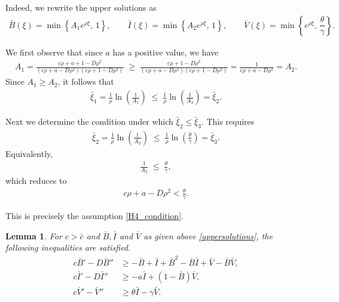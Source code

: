 \documentclass[11pt]{article}
\newtheorem{lemma}[thm]{Lemma}
\theoremstyle{definition}
\begin{document}
Indeed,  we rewrite the upper solutions as
\begin{align}\nonumber
    \bar{B}(\xi)=\min\left\{A_1 e^{\rho \xi},\, 1\right\}, 
    \qquad 
    \bar{I}(\xi)=\min\left\{A_2 e^{\rho \xi},\, 1\right\},
    \qquad 
    \bar{V}(\xi)=\min \left\{e^{\rho \xi},\, \dfrac{\theta}{\gamma}\right\}.
\end{align}

We first observe that since $a$ has a positive value, we have
\begin{align}
   A_1
   =\frac{c\rho + a + 1 - D\rho^{2}}{(c\rho + a - D\rho^{2})(c\rho + 1 - D\rho^{2})}
   \;\ge\;
   \frac{c\rho + 1 - D\rho^{2}}{(c\rho + a - D\rho^{2})(c\rho + 1 - D\rho^{2})}
   =\frac{1}{c\rho + a - D\rho^{2}}
   =A_2.
\end{align}
Since $A_1 \ge A_2$, it follows that
\begin{align}
    \bar{\xi}_1
    =\frac{1}{\rho}\ln\!\left(\frac{1}{A_1}\right)
    \;\le\;
    \frac{1}{\rho}\ln\!\left(\frac{1}{A_2}\right)
    =\bar{\xi}_2.
\end{align}

Next we determine the condition under which $\bar{\xi}_2 \le \bar{\xi}_3$.  
This requires
\begin{align}
    \bar{\xi}_2
    =\frac{1}{\rho}\ln\!\left(\frac{1}{A_2}\right)
    \;\le\;
    \frac{1}{\rho}\ln\!\left(\frac{\theta}{\gamma}\right)
    =\bar{\xi}_3.
\end{align}
Equivalently,
\begin{align}
    \frac{1}{A_2} \;\le\; \frac{\theta}{\gamma},
\end{align}
which reduces to
\begin{align}
    c\rho + a - D\rho^2 < \frac{\theta}{\gamma}.
\end{align}

This is precisely the assumption \eqref{H4_condition}.

\begin{lemma}
    For $c> \bar{c}$ and $\bar{B}, \bar{I}$ and $\bar{V}$ as given above \eqref{uppersolutions}, the following inequalities are satisfied. 
    \begin{align}\label{upper_condition_lemma}
      \nonumber  c \bar{B}'- D \bar{B}'' 
 &\geq- \bar{B}+\bar I +\bar{B}^2-\bar{B} \bar{I}+ \bar{V}-\bar{B} \bar{V}, \\  c \bar{I}'- D \bar{I}'' 
 &\geq -a\bar{I}+ (1-\bar{B})\bar{V}, \\ \nonumber c \bar{V}'-  \bar{V}'' 
 &\geq \theta \bar{I} - \gamma \bar{V}.
    \end{align}
\end{lemma}
\end{document}
